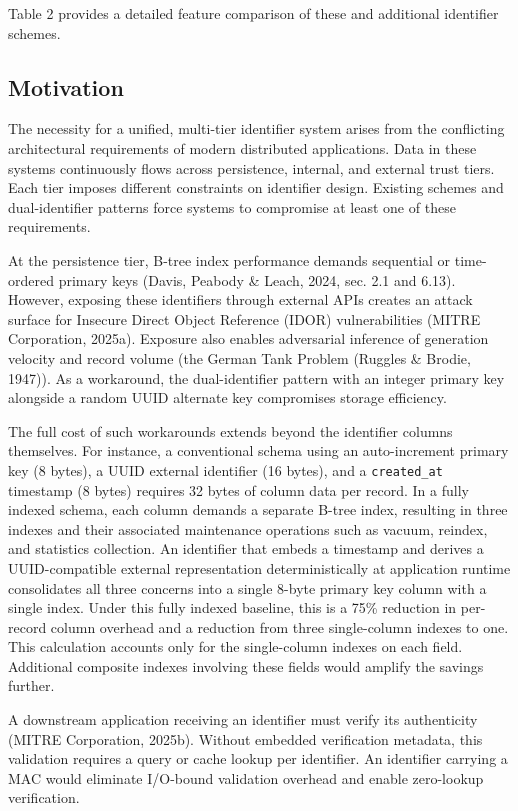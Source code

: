\documentclass[fleqn,10pt]{wlpeerj}
\begin{document}
Table 2 provides a detailed feature comparison of these and additional
identifier schemes.

\newpage

\subsection{Motivation}\label{motivation}

The necessity for a unified, multi-tier identifier system arises from
the conflicting architectural requirements of modern distributed
applications. Data in these systems continuously flows across
persistence, internal, and external trust tiers. Each tier imposes
different constraints on identifier design. Existing schemes and
dual-identifier patterns force systems to compromise at least one of
these requirements.

At the persistence tier, B-tree index performance demands sequential or
time-ordered primary keys (Davis, Peabody \& Leach, 2024, sec. 2.1 and
6.13). However, exposing these identifiers through external APIs creates
an attack surface for Insecure Direct Object Reference (IDOR)
vulnerabilities (MITRE Corporation, 2025a). Exposure also enables
adversarial inference of generation velocity and record volume (the
German Tank Problem (Ruggles \& Brodie, 1947)). As a workaround, the
dual-identifier pattern with an integer primary key alongside a random
UUID alternate key compromises storage efficiency.

The full cost of such workarounds extends beyond the identifier columns
themselves. For instance, a conventional schema using an auto-increment
primary key (8 bytes), a UUID external identifier (16 bytes), and a
\texttt{created\_at} timestamp (8 bytes) requires 32 bytes of column
data per record. In a fully indexed schema, each column demands a
separate B-tree index, resulting in three indexes and their associated
maintenance operations such as vacuum, reindex, and statistics
collection. An identifier that embeds a timestamp and derives a
UUID-compatible external representation deterministically at application
runtime consolidates all three concerns into a single 8-byte primary key
column with a single index. Under this fully indexed baseline, this is a
75\% reduction in per-record column overhead and a reduction from three
single-column indexes to one. This calculation accounts only for the
single-column indexes on each field. Additional composite indexes
involving these fields would amplify the savings further.

A downstream application receiving an identifier must verify its
authenticity (MITRE Corporation, 2025b). Without embedded verification
metadata, this validation requires a query or cache lookup per
identifier. An identifier carrying a MAC would eliminate I/O-bound
validation overhead and enable zero-lookup verification.
\end{document}
